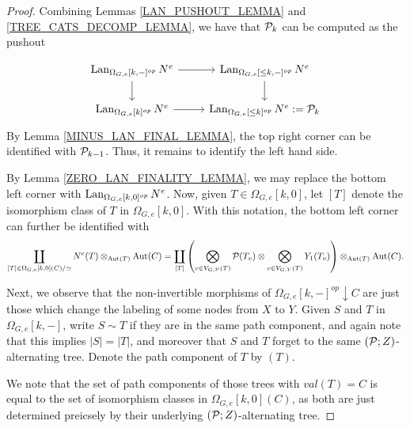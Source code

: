\documentclass[a4paper,10pt]{article}%
\begin{document}
\begin{proof}
  Combining Lemmas \ref{LAN_PUSHOUT_LEMMA} and \ref{TREE_CATS_DECOMP_LEMMA}, we have that $\P_k$ can be computed as the pushout

\begin{equation}
  \label{FILTRATION_LAN_SQUARE_DIAGRAM}
  \begin{tikzcd}
    \Lan_{\Omega_{G,e}[k,-]^{op}}N^e \arrow[d] \arrow[r] & \Lan_{\Omega_{G,e}[\leq k, -]^{op}}N^e \arrow[d] \\
    \Lan_{\Omega_{G,e}[k]^{op}}N^e \arrow[r] & \Lan_{\Omega_{G,e}[\leq k]^{op}}N^e := \P_k
  \end{tikzcd}
\end{equation}
By Lemma \ref{MINUS_LAN_FINAL_LEMMA}, the top right corner can be identified with $\P_{k-1}$. Thus, it remains to identify the left hand side.

By Lemma \ref{ZERO_LAN_FINALITY_LEMMA}, we may replace the bottom left corner with $\Lan_{\Omega_{G,e}[k,0]^{op}} N^e$.
Now, given $T\in \Omega_{G,e}[k,0]$, let $[T]$ denote the isomorphism class of $T$ in $\Omega_{G,e}[k,0]$. With this notation, the bottom left corner can further be identified with
\[
\displaystyle\coprod_{[T]\in \Omega_{G,e}[k,0](C)/\simeq}N^e(T)\otimes_{\mathrm{Aut}(T)}\Aut(C) 
= \displaystyle\coprod_{[T]}
\left(\bigotimes_{v\in V_{G,\P}(T)}\P(T_v) \otimes \bigotimes_{v\in V_{G,Y}(T)}Y_1(T_v) \right)
\otimes_{\mathrm{Aut}(T)}\Aut(C).
\]

Next, we observe that the non-invertible morphisms of $\Omega_{G,e}[k,-]^{op}\downarrow C$ are just those which change the labeling of some nodes from $X$ to $Y$. Given $S$ and $T$ in $\Omega_{G,e}[k,-]$, write $S \sim T$ if they are in the same path component, and again note that this implies $|S| = |T|$, and moreover that $S$ and $T$ forget to the same $(\P;Z)$-alternating tree. Denote the path component of $T$ by $(T)$.

We note that 
the set of path components of those trees with $val(T) = C$ is equal to the set of isomorphism classes in $\Omega_{G,e}[k,0](C)$, as both are just determined preicsely by their underlying $(\P;Z)$-alternating tree.


\end{proof}
\end{document}
